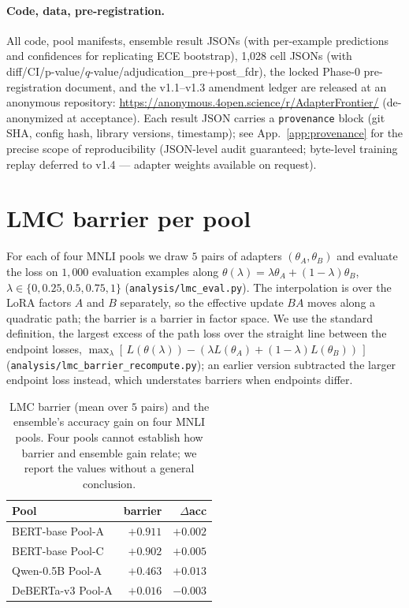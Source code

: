 \documentclass[11pt]{article}
\begin{document}
\paragraph{Code, data, pre-registration.} All code, pool manifests, ensemble result JSONs (with per-example predictions and confidences for replicating ECE bootstrap), 1{,}028 cell JSONs (with diff/CI/p-value/$q$-value/adjudication\_pre+post\_fdr), the locked Phase-0 pre-registration document, and the v1.1--v1.3 amendment ledger are released at an anonymous repository: \url{https://anonymous.4open.science/r/AdapterFrontier/} (de-anonymized at acceptance). Each result JSON carries a \texttt{provenance} block (git SHA, config hash, library versions, timestamp); see App.~\ref{app:provenance} for the precise scope of reproducibility (JSON-level audit guaranteed; byte-level training replay deferred to v1.4 — adapter weights available on request).

\section{LMC barrier per pool}\label{app:lmc}
For each of four MNLI pools we draw $5$ pairs of adapters $(\theta_A, \theta_B)$ and evaluate the loss on $1{,}000$ evaluation examples along $\theta(\lambda)=\lambda\theta_A+(1{-}\lambda)\theta_B$, $\lambda\!\in\!\{0,0.25,0.5,0.75,1\}$ (\texttt{analysis/\allowbreak lmc\_\allowbreak eval.\allowbreak py}). The interpolation is over the LoRA factors $A$ and $B$ separately, so the effective update $BA$ moves along a quadratic path; the barrier is a barrier in factor space. We use the standard definition, the largest excess of the path loss over the straight line between the endpoint losses, $\max_\lambda[\,L(\theta(\lambda)) - (\lambda L(\theta_A) + (1{-}\lambda) L(\theta_B))\,]$ (\texttt{analysis/\allowbreak lmc\_\allowbreak barrier\_\allowbreak recompute.\allowbreak py}); an earlier version subtracted the larger endpoint loss instead, which understates barriers when endpoints differ.
\begin{table}[h]
\centering
\caption{LMC barrier (mean over $5$ pairs) and the ensemble's accuracy gain on four MNLI pools. Four pools cannot establish how barrier and ensemble gain relate; we report the values without a general conclusion.}
\label{tab:lmc}
\small
\setlength{\tabcolsep}{3pt}
\begin{tabular}{@{}lrr@{}}
\toprule
Pool & barrier & $\Delta$acc \\
\midrule
BERT-base Pool-A   & $+0.911$ & $+0.002$ \\
BERT-base Pool-C   & $+0.902$ & $+0.005$ \\
Qwen-0.5B Pool-A   & $+0.463$ & $+0.013$ \\
DeBERTa-v3 Pool-A  & $+0.016$ & $-0.003$ \\
\bottomrule
\end{tabular}
\end{table}
\end{document}
